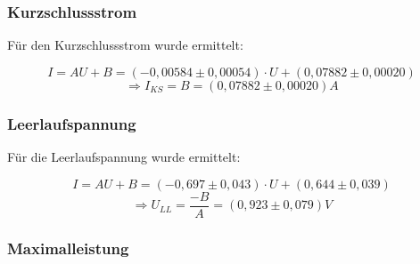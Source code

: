 \documentclass{article}
\begin{document}






\subsubsection{Kurzschlussstrom}

Für den Kurzschlussstrom wurde ermittelt:

$$I=AU+B=(-0,00584 \pm 0,00054)\cdot U + (0,07882 \pm 0,00020)$$
$$\Rightarrow I_{KS}=B=(0,07882 \pm 0,00020)A$$


\subsubsection{Leerlaufspannung}

Für die Leerlaufspannung wurde ermittelt:

$$I=AU+B=(-0,697 \pm 0,043)\cdot U + (0,644 \pm 0,039)$$
$$\Rightarrow U_{LL}=\frac{-B}{A}=(0,923 \pm 0,079)V$$

\subsubsection{Maximalleistung}

\end{document}
